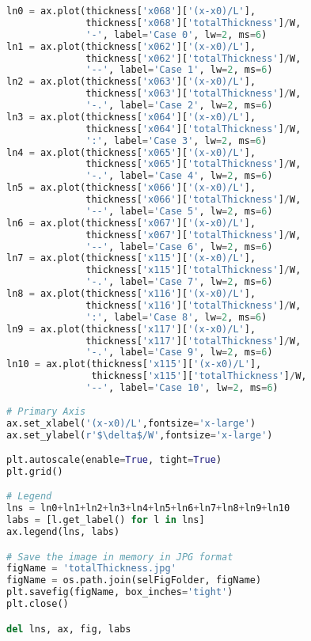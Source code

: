 \begin{lstlisting}[language=python]
ln0 = ax.plot(thickness['x068']['(x-x0)/L'],
              thickness['x068']['totalThickness']/W,
              '-', label='Case 0', lw=2, ms=6)
ln1 = ax.plot(thickness['x062']['(x-x0)/L'],
              thickness['x062']['totalThickness']/W,
              '--', label='Case 1', lw=2, ms=6)
ln2 = ax.plot(thickness['x063']['(x-x0)/L'],
              thickness['x063']['totalThickness']/W,
              '-.', label='Case 2', lw=2, ms=6)
ln3 = ax.plot(thickness['x064']['(x-x0)/L'],
              thickness['x064']['totalThickness']/W,
              ':', label='Case 3', lw=2, ms=6)
ln4 = ax.plot(thickness['x065']['(x-x0)/L'],
              thickness['x065']['totalThickness']/W,
              '-.', label='Case 4', lw=2, ms=6)
ln5 = ax.plot(thickness['x066']['(x-x0)/L'],
              thickness['x066']['totalThickness']/W,
              '--', label='Case 5', lw=2, ms=6)
ln6 = ax.plot(thickness['x067']['(x-x0)/L'],
              thickness['x067']['totalThickness']/W,
              '--', label='Case 6', lw=2, ms=6)
ln7 = ax.plot(thickness['x115']['(x-x0)/L'],
              thickness['x115']['totalThickness']/W,
              '-.', label='Case 7', lw=2, ms=6)
ln8 = ax.plot(thickness['x116']['(x-x0)/L'],
              thickness['x116']['totalThickness']/W,
              ':', label='Case 8', lw=2, ms=6)
ln9 = ax.plot(thickness['x117']['(x-x0)/L'],
              thickness['x117']['totalThickness']/W,
              '-.', label='Case 9', lw=2, ms=6)
ln10 = ax.plot(thickness['x115']['(x-x0)/L'],
               thickness['x115']['totalThickness']/W,
              '--', label='Case 10', lw=2, ms=6)
    
# Primary Axis
ax.set_xlabel('(x-x0)/L',fontsize='x-large')
ax.set_ylabel(r'$\delta$/W',fontsize='x-large')

plt.autoscale(enable=True, tight=True)
plt.grid()

# Legend
lns = ln0+ln1+ln2+ln3+ln4+ln5+ln6+ln7+ln8+ln9+ln10
labs = [l.get_label() for l in lns]
ax.legend(lns, labs)

# Save the image in memory in JPG format
figName = 'totalThickness.jpg'
figName = os.path.join(selFigFolder, figName)
plt.savefig(figName, box_inches='tight')
plt.close()

del lns, ax, fig, labs

\end{lstlisting}
